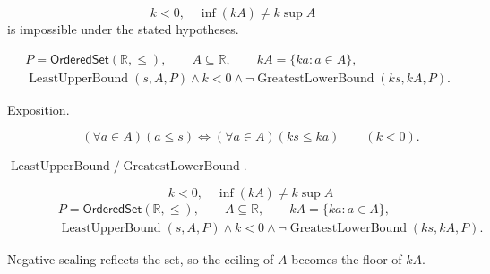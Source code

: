 \begin{remark*}
\[
k<0,\quad \inf(kA)\neq k\sup A
\]
is impossible under the stated hypotheses.
\end{remark*}

\begin{remark*}
\[
\begin{aligned}
&P=\mathsf{OrderedSet}(\mathbb{R},\leq),\qquad A\subseteq\mathbb{R},\qquad kA=\{ka:a\in A\},\\
&\operatorname{LeastUpperBound}(s,A,P)\land k<0\land
\neg\operatorname{GreatestLowerBound}(ks,kA,P).
\end{aligned}
\]
\end{remark*}

\begin{remark*}
\begin{description}
  \item[Exposition.]
\[
(\forall a\in A)(a\leq s)
\Longleftrightarrow
(\forall a\in A)(ks\leq ka)
\qquad(k<0).
\]


  \item[\(\operatorname{LeastUpperBound} / \operatorname{GreatestLowerBound}.\)]
  \[
k<0,\quad \inf(kA)\neq k\sup A
\]
\[
\begin{aligned}
&P=\mathsf{OrderedSet}(\mathbb{R},\leq),\qquad A\subseteq\mathbb{R},\qquad kA=\{ka:a\in A\},\\
&\operatorname{LeastUpperBound}(s,A,P)\land k<0\land
\neg\operatorname{GreatestLowerBound}(ks,kA,P).
\end{aligned}
\]
\end{description}
\end{remark*}

\begin{remark*}[Interpretation]
Negative scaling reflects the set, so the ceiling of $A$ becomes the floor of
$kA$.
\end{remark*}

